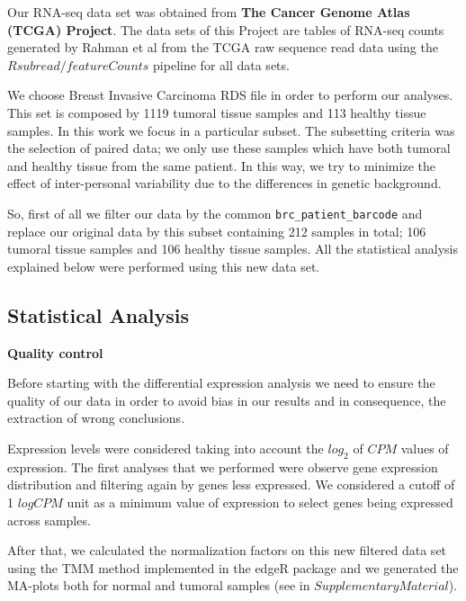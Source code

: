 \documentclass[9pt,twocolumn,twoside]{gsajnl}
\begin{document}
Our RNA-seq data set was obtained from \textbf{The Cancer Genome Atlas (TCGA) Project}. The data sets of this Project are tables of RNA-seq counts generated by Rahman et al \citep{Rahman15112015} from the TCGA raw sequence read data using the $Rsubread / featureCounts$ pipeline for all data sets.
\vspace{2 mm}

We choose Breast Invasive Carcinoma RDS file in order to perform our analyses. This set is composed by 1119 tumoral tissue samples and 113 healthy tissue samples. In this work we focus in a particular subset. The subsetting criteria was the selection of paired data; we only use these samples which have both tumoral and healthy tissue from the same patient. In this way, we try to minimize the effect of inter-personal variability due to the differences in genetic background.
\vspace{2 mm}
  
So, first of all we filter our data by the common \verb+brc_patient_barcode+ and replace our original data by this subset containing 212 samples in total; 106 tumoral tissue samples and 106 healthy tissue samples. All the statistical analysis explained below were performed using this new data set.


\subsection*{Statistical Analysis} 
\vspace{2mm}

\textbf{Quality control}
\vspace{2mm}

Before starting with the differential expression analysis we need to ensure the quality of our data in order to avoid bias in our results and in consequence, the extraction of wrong conclusions. 
\vspace{2mm}

Expression levels were considered taking into account the $log_{2}$ of $CPM$ values of expression. The first analyses that we performed were observe gene expression distribution and filtering again by genes less expressed. We considered a cutoff of 1 $log CPM$ unit as a minimum value of expression to select genes being expressed across samples.
\vspace{2mm}

After that, we calculated the normalization factors on this new filtered data set using the TMM method implemented in the edgeR package and we generated the MA-plots both for normal and tumoral samples (see in $Supplementary Material$).
\vspace{2mm}
\end{document}
